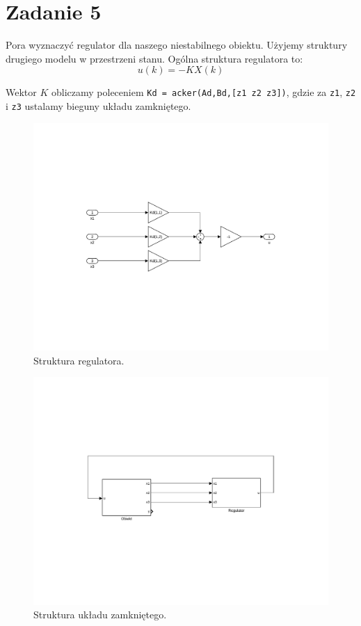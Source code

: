 \section{Zadanie 5} 
Pora wyznaczyć regulator dla naszego niestabilnego obiektu. Użyjemy struktury drugiego modelu w przestrzeni stanu. Ogólna struktura regulatora to:
\[
 u(k)=-KX(k)
\]

Wektor $K$ obliczamy poleceniem \texttt{Kd = acker(Ad,Bd,[z1 z2 z3])}, gdzie za \texttt{z1}, \texttt{z2} i \texttt{z3} ustalamy bieguny układu zamkniętego.
\begin{figure}[H]
\centering
 \includegraphics[width=\textwidth]{img/reg.pdf}
\caption{Struktura regulatora.}
\end{figure}

\begin{figure}[H]
\centering
 \includegraphics[width=\textwidth]{img/objreg.pdf}
\caption{Struktura układu zamkniętego.}
\end{figure}

